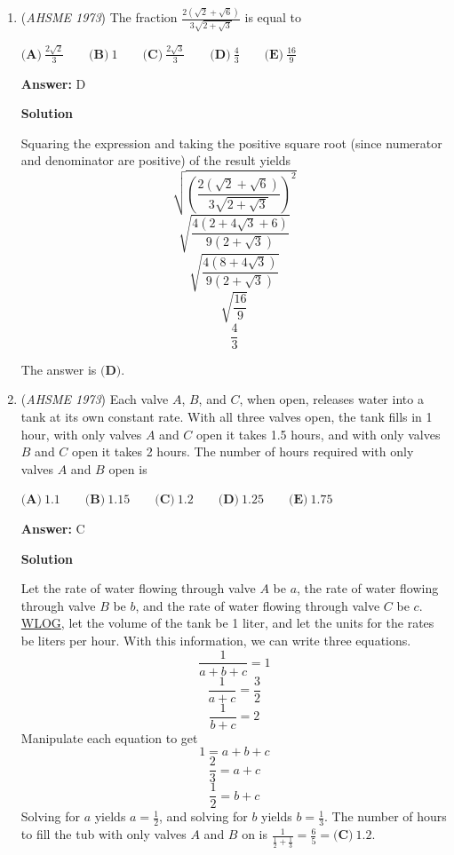 \begin{enumerate}
Let $d$ be the number of doctors and $l$ be the number of lawyers.  The average age of the doctors is $35$, so the sum of the doctors' ages is $35d$.  The average age of the lawyers is $50$, so the sum of the lawyers' ages is $50l$.  With the two information, we can write an equation.

 
 \[\frac{35d+50l}{d+l} = 40\]
 \[35d+50l=40d+40l\]
 \[10l=5d\]
 \[\frac{d}{l} = 2\]The ratio of the number of doctors to the number of lawyers is $\boxed{\textbf{(D)}\ 2: 1}$.

 


	\item (\textit{AHSME 1973}) The fraction $\frac{2(\sqrt2+\sqrt6)}{3\sqrt{2+\sqrt3}}$ is equal to 


 $\textbf{(A)}\ \frac{2\sqrt2}{3} \qquad \textbf{(B)}\ 1 \qquad \textbf{(C)}\ \frac{2\sqrt3}3 \qquad \textbf{(D)}\ \frac43 \qquad \textbf{(E)}\ \frac{16}{9}$

 \textbf{Answer: }D



\textbf{Solution}

Squaring the expression and taking the positive square root (since numerator and denominator are positive) of the result yields
 \[\sqrt{\left(\frac{2(\sqrt2+\sqrt6)}{3\sqrt{2+\sqrt3}}\right)^2}\]
 \[\sqrt{\frac{4(2+4\sqrt{3}+6)}{9(2+\sqrt{3})}}\]
 \[\sqrt{\frac{4(8+4\sqrt{3})}{9(2+\sqrt{3})}}\]
 \[\sqrt{\frac{16}{9}}\]
 \[\frac43\]

 The answer is $\boxed{\textbf{(D)}}$.

 


	\item (\textit{AHSME 1973}) Each valve $A$, $B$, and $C$, when open, releases water into a tank at its own constant rate. With all three valves open, the tank fills in 1 hour, with only valves $A$ and $C$ open it takes 1.5 hours, and with only valves $B$ and $C$ open it takes 2 hours. The number of hours required with only valves $A$ and $B$ open is 


  $\textbf{(A)}\ 1.1\qquad\textbf{(B)}\ 1.15\qquad\textbf{(C)}\ 1.2\qquad\textbf{(D)}\ 1.25\qquad\textbf{(E)}\ 1.75$

 \textbf{Answer: }C



\textbf{Solution}

Let the rate of water flowing through valve $A$ be $a$, the rate of water flowing through valve $B$ be $b$, and the rate of water flowing through valve $C$ be $c$.  \href{https://artofproblemsolving.com/wiki/index.php?title=WLOG}{WLOG}, let the volume of the tank be 1 liter, and let the units for the rates be liters per hour.  With this information, we can write three equations.
 \[\frac{1}{a+b+c} = 1\]
 \[\frac{1}{a+c} = \frac{3}{2}\]
 \[\frac{1}{b+c} = 2\]Manipulate each equation to get
 \[1 = a+b+c\]
 \[\frac{2}{3} = a+c\]
 \[\frac{1}{2} = b+c\]Solving for $a$ yields $a = \frac{1}{2}$, and solving for $b$ yields $b = \frac{1}{3}$.  The number of hours to fill the tub with only valves $A$ and $B$ on is $\frac{1}{\frac{1}{2} + \frac{1}{3}} = \frac{6}{5} = \boxed{\textbf{(C)}\ 1.2}$.


\end{enumerate}
